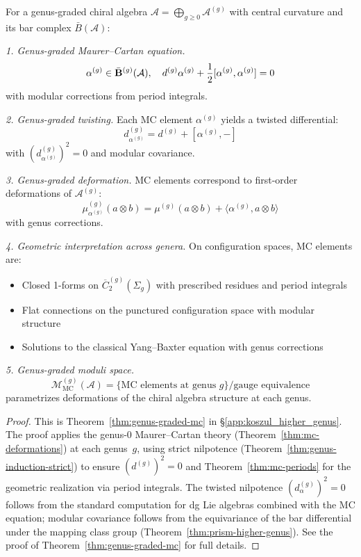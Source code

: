 \begin{theorem}
\label{thm:genus-graded-mc-appendix}
For a genus-graded chiral algebra $\mathcal{A} = \bigoplus_{g \geq 0} \mathcal{A}^{(g)}$
with central curvature and its bar complex $\bar{B}(\mathcal{A})$:

\emph{1. Genus-graded Maurer--Cartan equation.}
\[\alpha^{(g)} \in \bar{\mathbf{B}}^{(g)}(\mathcal{A}), \quad d^{(g)}\alpha^{(g)} + \frac{1}{2}[\alpha^{(g)}, \alpha^{(g)}] = 0\]
with modular corrections from period integrals.

\emph{2. Genus-graded twisting.}
Each MC element $\alpha^{(g)}$ yields a twisted differential:
\[d_{\alpha^{(g)}}^{(g)} = d^{(g)} + [\alpha^{(g)}, -]\]
with $(d_{\alpha^{(g)}}^{(g)})^2 = 0$ and modular covariance.

\emph{3. Genus-graded deformation.}
MC elements correspond to first-order deformations of $\mathcal{A}^{(g)}$:
\[\mu_{\alpha^{(g)}}^{(g)}(a \otimes b) = \mu^{(g)}(a \otimes b) + \langle \alpha^{(g)}, a \otimes b \rangle\]
with genus corrections.

\emph{4. Geometric interpretation across genera.}
On configuration spaces, MC elements are:
\begin{itemize}
\item Closed 1-forms on $\overline{C}_2^{(g)}(\Sigma_g)$ with prescribed residues and period integrals
\item Flat connections on the punctured configuration space with modular structure
\item Solutions to the classical Yang--Baxter equation with genus corrections
\end{itemize}

\emph{5. Genus-graded moduli space.}
\[\mathcal{M}_{\text{MC}}^{(g)}(\mathcal{A}) = \{\text{MC elements at genus } g\}/\text{gauge equivalence}\]
parametrizes deformations of the chiral algebra structure at each genus.
\end{theorem}

\begin{proof}
This is Theorem~\ref{thm:genus-graded-mc} in
\S\ref{app:koszul_higher_genus}. The proof applies the
genus-0 Maurer--Cartan theory
(Theorem~\ref{thm:mc-deformations}) at each genus~$g$,
using strict nilpotence
(Theorem~\ref{thm:genus-induction-strict}) to ensure
$(d^{(g)})^2 = 0$ and Theorem~\ref{thm:mc-periods} for
the geometric realization via period integrals.
The twisted nilpotence $(d_\alpha^{(g)})^2 = 0$ follows from
the standard computation for dg Lie algebras combined with
the MC equation; modular covariance follows from the
equivariance of the bar differential under the mapping class
group (Theorem~\ref{thm:prism-higher-genus}).  See the proof
of Theorem~\ref{thm:genus-graded-mc} for full details.
\end{proof}

